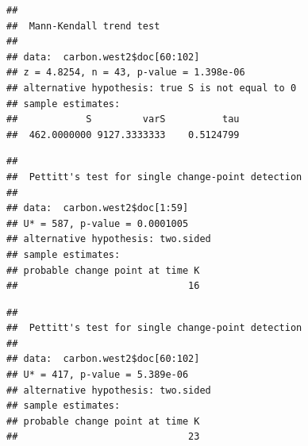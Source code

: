\documentclass[12pt,]{article}
\newenvironment{Shaded}{\begin{snugshade}}{\end{snugshade}}
\newcommand{\KeywordTok}[1]{\textcolor[rgb]{0.13,0.29,0.53}{\textbf{#1}}}
\newcommand{\DecValTok}[1]{\textcolor[rgb]{0.00,0.00,0.81}{#1}}
\newcommand{\CommentTok}[1]{\textcolor[rgb]{0.56,0.35,0.01}{\textit{#1}}}
\newcommand{\OperatorTok}[1]{\textcolor[rgb]{0.81,0.36,0.00}{\textbf{#1}}}
\newcommand{\NormalTok}[1]{#1}
\begin{document}
\begin{verbatim}
## 
##  Mann-Kendall trend test
## 
## data:  carbon.west2$doc[60:102]
## z = 4.8254, n = 43, p-value = 1.398e-06
## alternative hypothesis: true S is not equal to 0
## sample estimates:
##            S         varS          tau 
##  462.0000000 9127.3333333    0.5124799
\end{verbatim}

\begin{Shaded}
\end{Shaded}

\begin{verbatim}
## 
##  Pettitt's test for single change-point detection
## 
## data:  carbon.west2$doc[1:59]
## U* = 587, p-value = 0.0001005
## alternative hypothesis: two.sided
## sample estimates:
## probable change point at time K 
##                              16
\end{verbatim}

\begin{Shaded}
\end{Shaded}

\begin{verbatim}
## 
##  Pettitt's test for single change-point detection
## 
## data:  carbon.west2$doc[60:102]
## U* = 417, p-value = 5.389e-06
## alternative hypothesis: two.sided
## sample estimates:
## probable change point at time K 
##                              23
\end{verbatim}

\begin{Shaded}
\end{Shaded}
\end{document}
